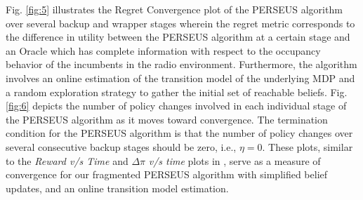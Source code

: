 \documentclass[10pt,twocolumn]{IEEEtran}
\begin{document}
Fig. \ref{fig:5} illustrates the Regret Convergence plot of the PERSEUS algorithm over several backup and wrapper stages wherein the regret metric corresponds to the difference in utility between the PERSEUS algorithm at a certain stage and an Oracle which has complete information with respect to the occupancy behavior of the incumbents in the radio environment. Furthermore, the algorithm involves an online estimation of the transition model of the underlying MDP and a random exploration strategy to gather the initial set of reachable beliefs. Fig. \ref{fig:6} depicts the number of policy changes involved in each individual stage of the PERSEUS algorithm as it moves toward convergence. The termination condition for the PERSEUS algorithm is that the number of policy changes over several consecutive backup stages should be zero, i.e., $\eta = 0$. These plots, similar to the \textit{Reward v/s Time} and $\Delta \pi$ \textit{v/s time} plots in \cite{DBLP:journals/corr/abs-1109-2145}, serve as a measure of convergence for our fragmented PERSEUS algorithm with simplified belief updates, and an online transition model estimation.
\end{document}
